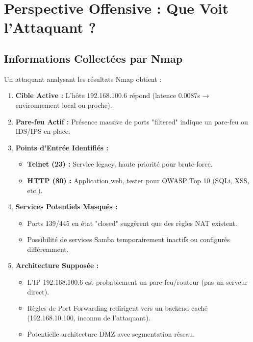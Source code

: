 \documentclass[12pt,a4paper,openany]{report}
\begin{document}
	\section{Perspective Offensive : Que Voit l'Attaquant ?}
	
	\subsection{Informations Collectées par Nmap}
	Un attaquant analysant les résultats Nmap obtient :
	
	\begin{enumerate}
		\item \textbf{Cible Active :} L'hôte 192.168.100.6 répond (latence 0.0087s → environnement local ou proche).
		
		\item \textbf{Pare-feu Actif :} Présence massive de ports "filtered" indique un pare-feu ou IDS/IPS en place.
		
		\item \textbf{Points d'Entrée Identifiés :}
		\begin{itemize}
			\item \textbf{Telnet (23) :} Service legacy, haute priorité pour brute-force.
			\item \textbf{HTTP (80) :} Application web, tester pour OWASP Top 10 (SQLi, XSS, etc.).
		\end{itemize}
		
		\item \textbf{Services Potentiels Masqués :}
		\begin{itemize}
			\item Ports 139/445 en état "closed" suggèrent que des règles NAT existent.
			\item Possibilité de services Samba temporairement inactifs ou configurés différemment.
		\end{itemize}
		
		\item \textbf{Architecture Supposée :}
		\begin{itemize}
			\item L'IP 192.168.100.6 est probablement un pare-feu/routeur (pas un serveur direct).
			\item Règles de Port Forwarding redirigent vers un backend caché (192.168.10.100, inconnu de l'attaquant).
			\item Potentielle architecture DMZ avec segmentation réseau.
		\end{itemize}
	\end{enumerate}
	
\end{document}
